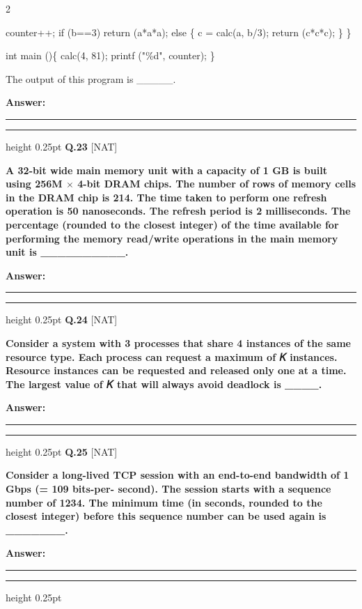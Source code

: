 \documentclass[a4paper,10pt,twoside]{article}
\begin{document}
\begin{multicols}{2}
{counter++;
if (b==3) return (a*a*a);
else \{
c = calc(a, b/3);
return (c*c*c);
\}
\}
\par\smallskip
int main ()\{
calc(4, 81);
printf ("\%d", counter);
\}
\par\smallskip
The output of this program is \_\_\_\_\_. \par}
\par\vspace{3pt}\noindent\textbf{Answer:} \rule{3.2cm}{0.4pt}
\par\vspace{6pt}\hrule height 0.25pt\vspace{6pt}
\noindent\textbf{Q.23} \hfill {\footnotesize\textsf{[NAT]}}
\par\vspace{2pt}
{\bfseries A 32-bit wide main memory unit with a capacity of 1 GB is built using 256M $\times$ 4-bit DRAM
chips. The number of rows of memory cells in the DRAM chip is 214. The time taken to
perform one refresh operation is 50 nanoseconds. The refresh period is 2 milliseconds. The
percentage (rounded to the closest integer) of the time available for performing the memory
read/write operations in the main memory unit is \_\_\_\_\_\_\_\_\_\_. \par}
\par\vspace{3pt}\noindent\textbf{Answer:} \rule{3.2cm}{0.4pt}
\par\vspace{6pt}\hrule height 0.25pt\vspace{6pt}
\noindent\textbf{Q.24} \hfill {\footnotesize\textsf{[NAT]}}
\par\vspace{2pt}
{\bfseries Consider a system with 3 processes that share 4 instances of the same resource type. Each
process can request a maximum of 𝐾 instances. Resource instances can be requested and
released only one at a time. The largest value of 𝐾 that will always avoid deadlock is \_\_\_\_. \par}
\par\vspace{3pt}\noindent\textbf{Answer:} \rule{3.2cm}{0.4pt}
\par\vspace{6pt}\hrule height 0.25pt\vspace{6pt}
\noindent\textbf{Q.25} \hfill {\footnotesize\textsf{[NAT]}}
\par\vspace{2pt}
{\bfseries Consider a long-lived TCP session with an end-to-end bandwidth of 1 Gbps (= 109 bits-per-
second). The session starts with a sequence number of 1234. The minimum time (in seconds,
rounded to the closest integer) before this sequence number can be used again is \_\_\_\_\_\_\_. \par}
\par\vspace{3pt}\noindent\textbf{Answer:} \rule{3.2cm}{0.4pt}
\par\vspace{6pt}\hrule height 0.25pt\vspace{6pt}


\end{multicols}
\end{document}
